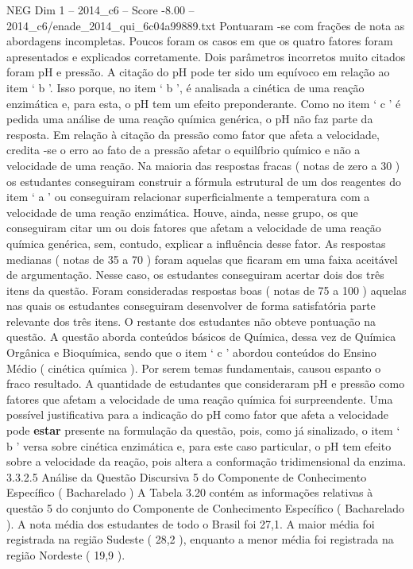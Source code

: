 \begin{textsample}{NEG Dim 1 – 2014\_c6 – Score -8.00 – 2014\_c6/enade\_2014\_qui\_6c04a99889.txt}
Pontuaram -se com frações de nota as abordagens incompletas.
Poucos foram os casos em que os quatro fatores foram apresentados e explicados corretamente.
Dois parâmetros incorretos muito citados foram pH e pressão.
A citação do pH pode ter sido um equívoco em relação ao item ‘ b ’.
Isso porque, no item ‘ b ’, é analisada a cinética de uma reação enzimática e, para esta, o pH tem um efeito preponderante.
Como no item ‘ c ’ é pedida uma análise de uma reação química genérica, o pH não faz parte da resposta.
Em relação à citação da pressão como fator que afeta a velocidade, credita -se o erro ao fato de a pressão afetar o equilíbrio químico e não a velocidade de uma reação.
Na maioria das respostas fracas ( notas de zero a 30 ) os estudantes conseguiram construir a fórmula estrutural de um dos reagentes do item ‘ a ’ ou conseguiram relacionar superficialmente a temperatura com a velocidade de uma reação enzimática.
Houve, ainda, nesse grupo, os que conseguiram citar um ou dois fatores que afetam a velocidade de uma reação química genérica, sem, contudo, explicar a influência desse fator.
As respostas medianas ( notas de 35 a 70 ) foram aquelas que ficaram em uma faixa aceitável de argumentação.
Nesse caso, os estudantes conseguiram acertar dois dos três itens da questão.
Foram consideradas respostas boas ( notas de 75 a 100 ) aquelas nas quais os estudantes conseguiram desenvolver de forma satisfatória parte relevante dos três itens.
O restante dos estudantes não obteve pontuação na questão.
A questão aborda conteúdos básicos de Química, dessa vez de Química Orgânica e Bioquímica, sendo que o item ‘ c ’ abordou conteúdos do Ensino Médio ( cinética química ).
Por serem temas fundamentais, causou espanto o fraco resultado.
A quantidade de estudantes que consideraram pH e pressão como fatores que afetam a velocidade de uma reação química foi surpreendente.
Uma possível justificativa para a indicação do pH como fator que afeta a velocidade pode \textbf{estar} presente na formulação da questão, pois, como já sinalizado, o item ‘ b ’ versa sobre cinética enzimática e, para este caso particular, o pH tem efeito sobre a velocidade da reação, pois altera a conformação tridimensional da enzima. 3.3.2.5 Análise da Questão Discursiva 5 do Componente de Conhecimento Específico ( Bacharelado ) A Tabela 3.20 contém as informações relativas à questão 5 do conjunto do Componente de Conhecimento Específico ( Bacharelado ).
A nota média dos estudantes de todo o Brasil foi 27,1.
A maior média foi registrada na região Sudeste ( 28,2 ), enquanto a menor média foi registrada na região Nordeste ( 19,9 ).

\end{textsample}
